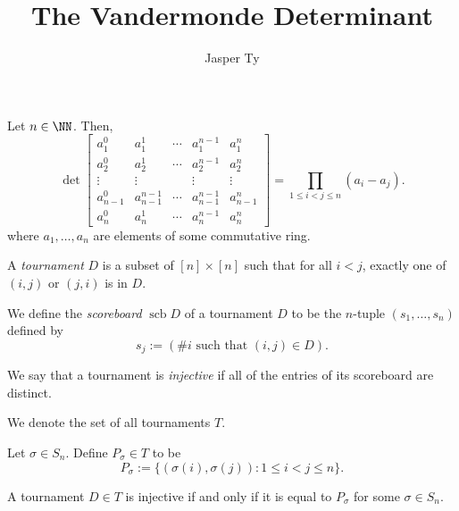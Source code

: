 \documentclass{article}
\title{The Vandermonde Determinant}
\author{Jasper Ty}
\date{}
\DeclareMathOperator{\scb}{scb}
\begin{document}
\maketitle

\begin{theorem}\label{thm:vandermonde}
    Let $n \in \NN$. Then,
    \[
        \det\begin{bmatrix}
            a_1^0 & a_1^1 & \cdots & a_1^{n-1} & a_1^n \\
            a_2^0 & a_2^1 & \cdots & a_2^{n-1} & a_2^n \\
            \vdots & \vdots &  & \vdots & \vdots \\
            a_{n-1}^0 & a_{n-1}^{n-1} & \cdots & a_{n-1}^{n-1} & a_{n-1}^n \\
            a_n^0 & a_n^1 & \cdots & a_n^{n-1} & a_n^n
        \end{bmatrix} = \prod_{1\leq i < j \leq n}(a_i-a_j).
    \]
    where $a_1, \ldots, a_n$ are elements of some commutative ring.
\end{theorem}

\begin{definition}
    A \textit{tournament} $D$ is a subset of $[n]\times[n]$ such that for all $i < j$, exactly one of $(i,j)$ or $(j,i)$ is in $D$.

    We define the \textit{scoreboard} $\scb D$ of a tournament $D$ to be the $n$-tuple $(s_1,\ldots,s_n)$ defined by
    \[
        s_j := (\# i \text{ such that } (i,j) \in D).
    \]

    We say that a tournament is \textit{injective} if all of the entries of its scoreboard are distinct.

    We denote the set of all tournaments $T$.
\end{definition}

\begin{definition}
    Let $\sigma \in S_n$.
    Define $P_\sigma \in T$ to be
    \[
        P_\sigma := \{(\sigma(i), \sigma(j)): 1 \leq i < j \leq n\}.
    \]
\end{definition}

\begin{lemma}
    A tournament $D \in T$ is injective if and only if it is equal to $P_\sigma$ for some $\sigma \in S_n$.
\end{lemma}
\end{document}
